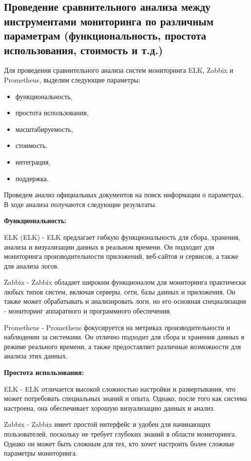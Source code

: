\subsection{Проведение сравнительного анализа между инструментами мониторинга по различным параметрам (функциональность, простота использования, стоимость и т.д.)}

Для проведения сравнительного анализа систем мониторинга ELK, Zabbix и Prometheus, выделим следующие параметры: 
\begin{itemize}
    \item функциональность,
    \item простота использования,
    \item масштабируемость,
    \item стоимость,
    \item интеграция,
    \item поддержка.
\end{itemize}

Проведем анализ официальных документов на поиск информации о параметрах. В ходе анализа получаются следующие результаты.

\textbf{Функциональность:}

ELK (ELK) - ELK предлагает гибкую функциональность для сбора, хранения, анализа и визуализации данных в реальном времени. 
Он подходит для мониторинга производительности приложений, веб-сайтов и сервисов, а также для анализа логов.

Zabbix - Zabbix обладает широким функционалом для мониторинга практически любых типов систем, включая серверы, сети, 
базы данных и приложения. Он также может обрабатывать и анализировать логи, но его основная специализация - 
мониторинг аппаратного и программного обеспечения.

Prometheus - Prometheus фокусируется на метриках производительности и наблюдении за системами. 
Он отлично подходит для сбора и хранения данных в режиме реального времени, а также предоставляет различные
возможности для анализа этих данных.

\textbf{Простота использования:}

ELK - ELK отличается высокой сложностью настройки и развертывания, что может потребовать специальных знаний и опыта. 
Однако, после того как система настроена, она обеспечивает хорошую визуализацию данных и анализ.

Zabbix - Zabbix имеет простой интерфейс и удобен для начинающих пользователей, поскольку не требует глубоких 
знаний в области мониторинга. Однако он может быть сложным для тех, кто хочет настроить более сложные параметры мониторинга.

